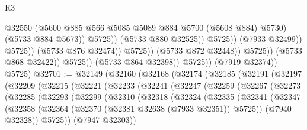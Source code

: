 \begin{lexlean}{R3}
\begin{coremodule}
                                                  @32550
                                                  (@5600
                                                    @885
                                                    @566
                                                    @5085
                                                    @5089
                                                    @884
                                                    @5700
                                                    (@5608 @884)
                                                    @5730)
                                                  (@5733 @884 @5673))
                                                @5725))
                                            (@5733 @880 @32525))
                                          @5725))
                                      (@7933 @32499))
                                    @5725))
                                (@5733 @876 @32474))
                              @5725))
                          (@5733 @872 @32448))
                        @5725))
                    (@5733 @868 @32422))
                  @5725))
              (@5733 @864 @32398))
            @5725))
        (@7919 @32374))
      @5725)
@32701 := @32149
    (@32160
      (@32168
        (@32174
          (@32185
            (@32191
              (@32197
                (@32209
                  (@32215
                    (@32221
                      (@32233
                        (@32241
                          (@32247
                            (@32259
                              (@32267
                                (@32273
                                  (@32285
                                    (@32293
                                      (@32299
                                        (@32310
                                          (@32318
                                            (@32324
                                              (@32335
                                                (@32341
                                                  (@32347
                                                    (@32358
                                                      (@32364
                                                        (@32370
                                                          (@32381 @32638 (@7933 @32351))
                                                          @5725))
                                                      (@7940 @32328))
                                                    @5725))
                                                (@7947 @32303))

\end{coremodule}
\end{lexlean}
